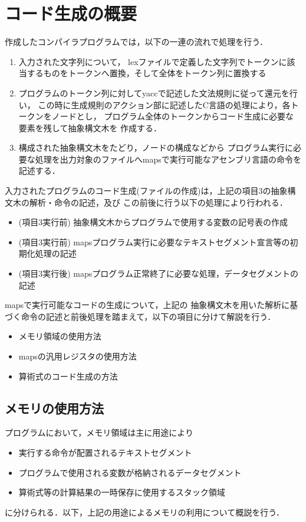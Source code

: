 \section{コード生成の概要}
作成したコンパイラプログラムでは，以下の一連の流れで処理を行う．
\begin{enumerate}
  \item 入力された文字列について，
  lexファイルで定義した文字列でトークンに該当するものをトークンへ置換，そして全体をトークン列に置換する
  \item プログラムのトークン列に対してyaccで記述した文法規則に従って還元を行い，
  この時に生成規則のアクション部に記述したC言語の処理により，各トークンをノードとし，
  プログラム全体のトークンからコード生成に必要な要素を残して抽象構文木を
  作成する．
  \item 構成された抽象構文木をたどり，ノードの構成などから
  プログラム実行に必要な処理を出力対象のファイルへmapsで実行可能なアセンブリ言語の命令を記述する．
\end{enumerate}

入力されたプログラムのコード生成(ファイルの作成)は，上記の項目3の抽象構文木の解析・命令の記述，及び
この前後に行う以下の処理により行われる．
\begin{itemize}
  \item (項目3実行前) 抽象構文木からプログラムで使用する変数の記号表の作成
  \item (項目3実行前) mapsプログラム実行に必要なテキストセグメント宣言等の初期化処理の記述
  \item (項目3実行後) mapsプログラム正常終了に必要な処理，データセグメントの記述
\end{itemize}

mapsで実行可能なコードの生成について，上記の
抽象構文木を用いた解析に基づく命令の記述と前後処理を踏まえて，以下の項目に分けて解説を行う．
\begin{itemize}
  \item メモリ領域の使用方法
  \item mapsの汎用レジスタの使用方法
  \item 算術式のコード生成の方法
\end{itemize}

\subsection{メモリの使用方法}
プログラムにおいて，メモリ領域は主に用途により
\begin{itemize}
  \item 実行する命令が配置されるテキストセグメント
  \item プログラムで使用される変数が格納されるデータセグメント
  \item 算術式等の計算結果の一時保存に使用するスタック領域
\end{itemize}
に分けられる．以下，上記の用途によるメモリの利用について概説を行う．

